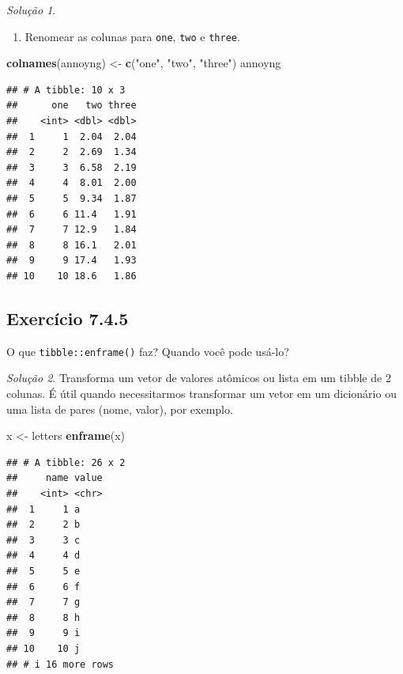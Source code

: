 \documentclass[
]{latex/krantz}
\newenvironment{Shaded}{\begin{snugshade}}{\end{snugshade}}
\newcommand{\FunctionTok}[1]{\textcolor[rgb]{0.13,0.29,0.53}{\textbf{#1}}}
\newcommand{\NormalTok}[1]{#1}
\newcommand{\OtherTok}[1]{\textcolor[rgb]{0.56,0.35,0.01}{#1}}
\newcommand{\StringTok}[1]{\textcolor[rgb]{0.31,0.60,0.02}{#1}}
\providecommand{\tightlist}{%
  \setlength{\itemsep}{0pt}\setlength{\parskip}{0pt}}
\theoremstyle{definition}
\theoremstyle{definition}
\theoremstyle{definition}
\theoremstyle{definition}
\theoremstyle{remark}
\newtheorem*{solution}{Solução}
\begin{document}
\begin{solution}
\begin{enumerate}
\def\labelenumi{\alph{enumi}.}
\setcounter{enumi}{3}
\tightlist
\item
  Renomear as colunas para \texttt{one}, \texttt{two} e \texttt{three}.
\end{enumerate}

\begin{Shaded}
\begin{Highlighting}[]
\FunctionTok{colnames}\NormalTok{(annoyng) }\OtherTok{\textless{}{-}} \FunctionTok{c}\NormalTok{(}\StringTok{"one"}\NormalTok{, }\StringTok{"two"}\NormalTok{, }\StringTok{"three"}\NormalTok{)}
\NormalTok{annoyng}
\end{Highlighting}
\end{Shaded}

\begin{verbatim}
## # A tibble: 10 x 3
##      one   two three
##    <int> <dbl> <dbl>
##  1     1  2.04  2.04
##  2     2  2.69  1.34
##  3     3  6.58  2.19
##  4     4  8.01  2.00
##  5     5  9.34  1.87
##  6     6 11.4   1.91
##  7     7 12.9   1.84
##  8     8 16.1   2.01
##  9     9 17.4   1.93
## 10    10 18.6   1.86
\end{verbatim}

\end{solution}

\hypertarget{exr7-4-5}{%
\subsection*{Exercício 7.4.5}\label{exr7-4-5}}

O que \texttt{tibble::enframe()} faz? Quando você pode usá-lo?

\begin{solution}

Transforma um vetor de valores atômicos ou lista em um tibble de 2 colunas. É útil quando necessitarmos transformar um vetor em um dicionário ou uma lista de pares (nome, valor), por exemplo.

\begin{Shaded}
\begin{Highlighting}[]
\NormalTok{x }\OtherTok{\textless{}{-}}\NormalTok{ letters}
\FunctionTok{enframe}\NormalTok{(x)}
\end{Highlighting}
\end{Shaded}

\begin{verbatim}
## # A tibble: 26 x 2
##     name value
##    <int> <chr>
##  1     1 a    
##  2     2 b    
##  3     3 c    
##  4     4 d    
##  5     5 e    
##  6     6 f    
##  7     7 g    
##  8     8 h    
##  9     9 i    
## 10    10 j    
## # i 16 more rows
\end{verbatim}

\end{solution}
\end{document}
